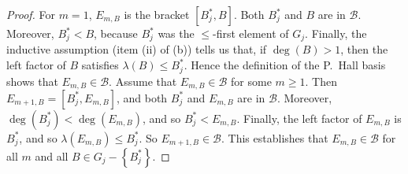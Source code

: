 \documentclass[leqno]{article}
\theoremstyle{plain}
\begin{document}
\begin{proof}
	For $m=1$, $E_{m, B}$ is the bracket $\left[B_{j}^{*}, B\right]$.
	Both $B_{j}^{*}$ and $B$ are in $\mathcal{B}$. 
	Moreover, $B_{j}^{*}<B$, because $B_{j}^{*}$ was the $\leq$-first element of $G_{j}$. 
	Finally, the inductive assumption (item (ii) of (b)) tells us that, if $\operatorname{deg}(B)>1$, then the left factor of $B$ satisfies $\lambda(B) \leq B_{j}^{*}$. 
	Hence the definition of the P.\ Hall basis shows that $E_{m, B} \in \mathcal{B}$. 
	Assume that $E_{m, B} \in \mathcal{B}$ for some $m \geq 1$. 
	Then $E_{m+1, B}=\left[B_{j}^{*}, E_{m, B}\right]$, and both $B_{j}^{*}$ and $E_{m, B}$ are in $\mathcal{B}$. 
	Moreover, $\operatorname{deg}\left(B_{j}^{*}\right)<\operatorname{deg}\left(E_{m, B}\right)$, and so $B_{j}^{*} < E_{m, B}$. 
	Finally, the left factor of $E_{m, B}$ is $B_{j}^{*}$, and so $\lambda\left(E_{m, B}\right) \leq B_{j}^{*}$. 
	So $E_{m+1, B} \in \mathcal{B}$. 
	This establishes that $E_{m, B} \in \mathcal{B}$ for all $m$ and all $B \in G_{j}-\left\{B_{j}^{*}\right\}$.


\end{proof}
\end{document}
